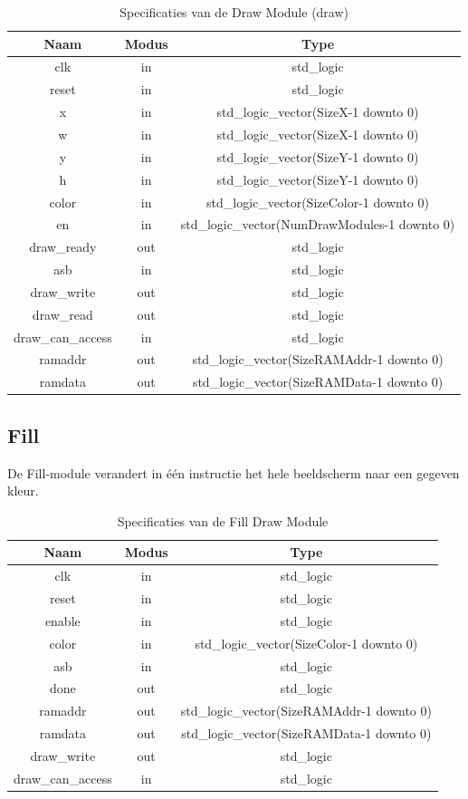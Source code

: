 \documentclass{scrreprt} %
\begin{document}
\begin{table}[H]
\centering
\caption{Specificaties van de Draw Module (draw)}
\label{tab:spec-draw}
\begin{tabular}{c c c}
	\hline\hline
 	Naam & Modus & Type\\
 	\hline	
	 clk & in & std\_logic \\
	 reset & in & std\_logic \\
	 x & in & std\_logic\_vector(SizeX-1 downto 0) \\ 
	 w & in & std\_logic\_vector(SizeX-1 downto 0) \\
	 y & in & std\_logic\_vector(SizeY-1 downto 0) \\
	 h & in & std\_logic\_vector(SizeY-1 downto 0) \\ 
	 color & in & std\_logic\_vector(SizeColor-1 downto 0) \\ 
	 en & in & std\_logic\_vector(NumDrawModules-1 downto 0) \\ 
	 draw\_ready & out & std\_logic \\
	 asb & in & std\_logic \\ 
	 draw\_write & out & std\_logic \\
	 draw\_read & out & std\_logic \\
	 draw\_can\_access & in & std\_logic \\
	 ramaddr & out & std\_logic\_vector(SizeRAMAddr-1 downto 0) \\
	 ramdata & out & std\_logic\_vector(SizeRAMData-1 downto 0) \\
  	\hline
\end{tabular}
\end{table}

\subsection {Fill}
De Fill-module verandert in één instructie het hele beeldscherm naar een gegeven kleur.

\begin{table}[H]
\centering
\caption{Specificaties van de Fill Draw Module}
\label{tab:spec-fill-draw}
\begin{tabular}{c c c}
	\hline\hline
 	Naam & Modus & Type\\
 	\hline	
	clk & in & std\_logic \\
	reset & in & std\_logic \\
	enable& in & std\_logic \\
	color & in & std\_logic\_vector(SizeColor-1 downto 0) \\
	asb & in & std\_logic \\
	done & out & std\_logic \\
	ramaddr &out & std\_logic\_vector(SizeRAMAddr-1 downto 0) \\
	ramdata &out & std\_logic\_vector(SizeRAMData-1 downto 0) \\
	draw\_write &out & std\_logic \\
	draw\_can\_access & in & std\_logic \\
  	\hline
\end{tabular}
\end{table}
\end{document}
